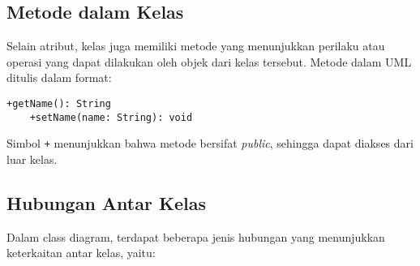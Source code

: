 \subsection{Metode dalam Kelas}
Selain atribut, kelas juga memiliki metode yang menunjukkan perilaku atau operasi yang dapat dilakukan oleh objek dari kelas tersebut. Metode dalam UML ditulis dalam format:
\begin{lstlisting}[language=puml]
	+getName(): String
	+setName(name: String): void
\end{lstlisting}
Simbol \texttt{+} menunjukkan bahwa metode bersifat \textit{public}, sehingga dapat diakses dari luar kelas.

\subsection{Hubungan Antar Kelas}
Dalam class diagram, terdapat beberapa jenis hubungan yang menunjukkan keterkaitan antar kelas, yaitu:


